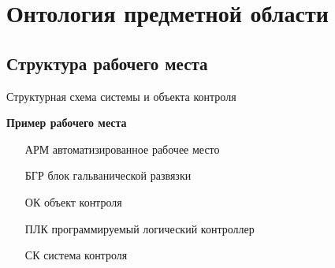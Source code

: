 \section[Теория]{Онтология предметной области}
\subsection{Структура рабочего места}

\begin{frame}{Структурная схема системы и объекта контроля}
    \begin{minipage}[t]{0.57\linewidth}
        \textbf{\tiny Пример рабочего места}
    \end{minipage}
    \hfill
    \begin{minipage}[t]{0.4\linewidth}
        \begin{itemize}
            \item[АРМ] автоматизированное рабочее место
            \item[БГР] блок гальванической развязки
            \item[ОК]  объект контроля
            \item[ПЛК] программируемый логический контроллер
            \item[СК]  система контроля            
        \end{itemize}
    \end{minipage}\pause
    \vspace{1pt}
    \centering{\leadingOrganizationTitle}
\end{frame}

